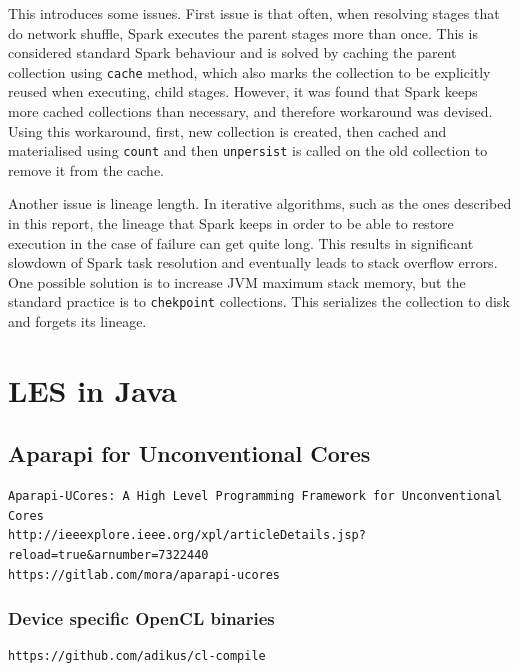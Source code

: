 \documentclass{l4proj}
\begin{document}
This introduces some issues. First issue is that often, when resolving stages that
do network shuffle, Spark executes the parent stages more than once. This is
considered standard Spark behaviour and is solved by caching the parent collection
using \texttt{cache} method, which also marks the collection to be explicitly reused
when executing, child stages. However, it was found that Spark keeps more cached collections
than necessary, and therefore workaround was devised. Using this workaround, first,
new collection is created, then cached and materialised using \texttt{count} and 
then \texttt{unpersist} is called on the old collection to remove it from the cache.

Another issue is lineage length. In iterative algorithms, such as the ones described 
in this report, the lineage that Spark keeps in order to be able to restore execution
in the case of failure can get quite long. This results in significant slowdown of
Spark task resolution and eventually leads to stack overflow errors. One possible
solution is to increase JVM maximum stack memory, but the standard practice is to
\texttt{chekpoint} collections. This serializes the collection to disk and forgets
its lineage. 

\chapter{LES in Java}
\label{chap:les_java}

\section{Aparapi for Unconventional Cores}

\begin{verbatim}
Aparapi-UCores: A High Level Programming Framework for Unconventional Cores
http://ieeexplore.ieee.org/xpl/articleDetails.jsp?reload=true&arnumber=7322440
https://gitlab.com/mora/aparapi-ucores
\end{verbatim}

\subsection{Device specific OpenCL binaries}

\begin{verbatim}
https://github.com/adikus/cl-compile
\end{verbatim}
\end{document}

